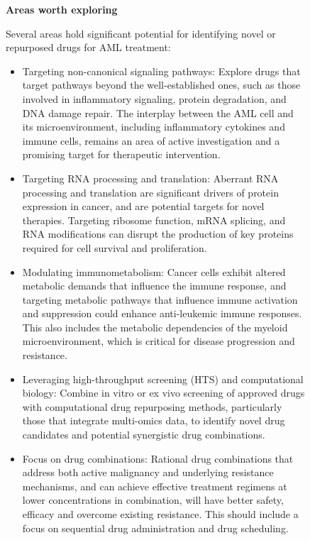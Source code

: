 \begin{figure}[htbp!]
\begin{tcolorbox}[
    colback=black!5!white,
    colframe=black!60!white,
    title=\textbf{KIRA6 for AML (continued)},
    fonttitle=\bfseries,
    arc=3mm,
    boxrule=1pt,
    bottomrule=2pt,
]
\scriptsize

\textbf{Areas worth exploring} 

Several areas hold significant potential for identifying novel or repurposed drugs for AML treatment:
\begin{itemize}
    \item Targeting non-canonical signaling pathways: Explore drugs that target pathways beyond the well-established ones, such as those involved in inflammatory signaling, protein degradation, and DNA damage repair. The interplay between the AML cell and its microenvironment, including inflammatory cytokines and immune cells, remains an area of active investigation and a promising target for therapeutic intervention.
    \item Targeting RNA processing and translation: Aberrant RNA processing and translation are significant drivers of protein expression in cancer, and are potential targets for novel therapies. Targeting ribosome function, mRNA splicing, and RNA modifications can disrupt the production of key proteins required for cell survival and proliferation.
    \item Modulating immunometabolism: Cancer cells exhibit altered metabolic demands that influence the immune response, and targeting metabolic pathways that influence immune activation and suppression could enhance anti-leukemic immune responses. This also includes the metabolic dependencies of the myeloid microenvironment, which is critical for disease progression and resistance.
    \item Leveraging high-throughput screening (HTS) and computational biology: Combine in vitro or ex vivo screening of approved drugs with computational drug repurposing methods, particularly those that integrate multi-omics data, to identify novel drug candidates and potential synergistic drug combinations.
    \item Focus on drug combinations: Rational drug combinations that address both active malignancy and underlying resistance mechanisms, and can achieve effective treatment regimens at lower concentrations in combination, will have better safety, efficacy and overcome existing resistance. This should include a focus on sequential drug administration and drug scheduling.

\end{itemize}
\end{tcolorbox}
\end{figure}
